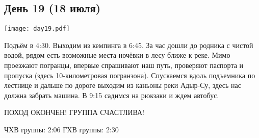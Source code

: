 \graphicspath{{Pictures/Chapter5/Day19}}



\subsection{День 19 (18 июля)}\label{subsec:Day19}
    \parbox[c]{\textwidth}{%
        \texttt{[image: day19.pdf]}\label{fig:Day19_map}%
    }
    \vspace{0.8cm}

Подъём в 4:30. Выходим из кемпинга в 6:45. За час дошли до родника с чистой водой, рядом есть возможные места ночёвки в лесу ближе к реке. Мимо проезжают погранцы, впервые спрашивают наш путь, проверяют паспорта и пропуска (здесь 10-километровая погранзона). Спускаемся вдоль подъемника по лестнице и дальше по дороге выходим из каньоны реки Адыр-Су, здесь нас должна забрать машина. В 9:15 садимся на рюкзаки и ждем автобус.

ПОХОД ОКОНЧЕН! ГРУППА СЧАСТЛИВА!







ЧХВ группы: 2:06
ГХВ группы: 2:30

    \FloatBarrier
